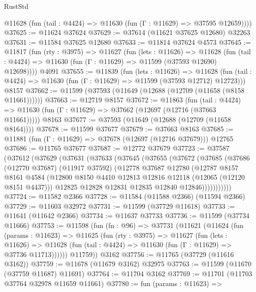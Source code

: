 \begin{lexlean}{RustStd}
\begin{coremodule}
      @11628 (fun (tail : @4424) => @11630 (fun (Γ : @11629) => @37595 @12659))))
@37625 := @11624 @37624
@37629 := @37614 (@11621 @37625 @12680) @32263
@37631 := @11584 @37625 @12680
@37633 := @11814 @37624 @4573
@37645 := @11817
    (fun (rty : @3975) =>
    @11627
      (fun (lets : @11626) =>
      @11628 (fun (tail : @4424) => @11630 (fun (Γ : @11629) => @11599 (@37593 @12690) @12698))))
    @4091
@37655 := @11839
    (fun (lets : @11626) =>
    @11628 (fun (tail : @4424) => @11630 (fun (Γ : @11629) => @11599 (@37593 @12712) @12723)))
    @8157
@37662 := @11599 (@37593 (@11649 (@12688 (@12709 (@11658 (@8158 @11661))))))
@37663 := @12719 @8157
@37672 := @11863
    (fun (tail : @4424) => @11630 (fun (Γ : @11629) => @37662 (@12697 (@12716 (@37663 @11661)))))
    @8163
@37677 := @37593 (@11649 (@12688 (@12709 (@11658 @8164))))
@37678 := @11599 @37677
@37679 := @37663 @8163
@37685 := @11881 (fun (Γ : @11629) => @37678 (@12697 (@12716 @37679))) @12765
@37686 := @11765 @37677
@37687 := @12772 @37679
@37723 := @37587
    (@37612
      (@37629
        (@37631
          (@37633
            (@37645
              (@37655
                (@37672
                  (@37685
                    (@37686
                      (@12770 @37687)
                      (@11917 @37592)
                      (@12778
                        @37687
                        @12780
                        (@12787
                          @8157
                          @8161
                          @4584
                          (@12800 @8150 @4410 @12813 @12816 @12118 (@12065 (@12120 @8151 @4437)))
                          @12825
                          @12828
                          @12831
                          @12835
                          @12840
                          @12846)))))))))))
@37724 := @11582 @2366
@37728 := @11584 (@11588 @2366) (@11594 @2366)
@37729 := @11603 @32972
@37731 := @11599 (@37729 @11618)
@37733 := @11641 (@11642 @2366)
@37734 := @11637 @37733
@37736 := @11599 (@37734 @11666)
@37753 := @11598
    (fun (fn : @96) =>
    @37731
      (@11621
        (@11624
          (fun (params : @11623) =>
          @11625
            (fun (rty : @3975) =>
            @11627
              (fun (lets : @11626) =>
              @11628 (fun (tail : @4424) => @11630 (fun (Γ : @11629) => @37736 @11713))))))
        @11759))
    @3162
@37756 := @11765 (@37729 (@11616 @3162))
@37759 := @11678 (@11679 @3162) @32975
@37763 := @11599 (@11670 (@37759 @11687) @11691)
@37764 := @11704 @3162
@37769 := @11701 (@11703 @37764 @32978 @11659 @11661)
@37780 := fun (params : @11623) =>

\end{coremodule}
\end{lexlean}
